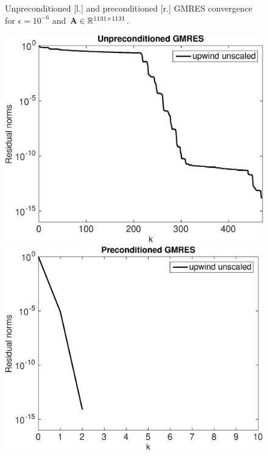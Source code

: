 \begin{figure}[tbhp]
\begin{minipage}[t]{0.5\linewidth}
\vspace*{-1em}
\end{minipage}
\vspace*{-1em}
\caption{Unpreconditioned [l.] and preconditioned [r.] GMRES convergence for $\epsilon=10^{-6}$ and $\mathbf{A} \in \mathbb{R}^{1131\times1131}$.}\label{fig:2D:prec2}
\end{figure}
%
\begin{figure}[tbhp]
\hspace*{-0.5em}
\begin{minipage}[t]{0.5\linewidth}
\includegraphics[width=0.95\linewidth]{figures/gmres_upwind2D_eps_1e-04_N_30_M_40}
\vspace*{-1em}
\end{minipage}
\vspace*{-1em}
\begin{minipage}[t]{0.5\linewidth}
\includegraphics[width=0.95\linewidth]{figures/gmres_precond_upwind2D_eps_1e-06_N_30_M_40}

\end{minipage}
\end{figure}
